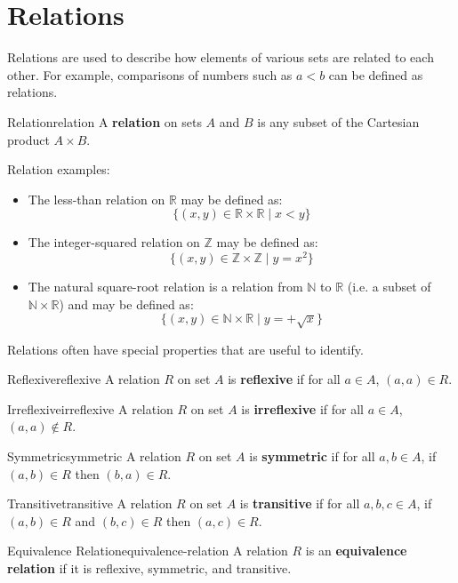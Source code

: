 \section{Relations}
Relations are used to describe how elements of various sets 
are related to each other. For example, comparisons of numbers such as 
\( a < b \) can be defined as relations.

\begin{definition}{Relation}{relation}
  A \textbf{relation} on sets \( A \) and \( B \) is any subset of the 
  Cartesian product \( A \times B \).  
\end{definition}

Relation examples:
\begin{itemize}
  \item The less-than relation on \( \mathbb{R} \) may be defined as:
    \[
      \{ (x, y) \in \mathbb{R} \times \mathbb{R} \mid x < y \}
    \]
  \item The integer-squared relation on \( \mathbb{Z} \) may be defined as:
    \[
      \{ (x, y) \in \mathbb{Z} \times \mathbb{Z} \mid y = x^2 \}
    \]
  \item The natural square-root relation is a relation from \( \mathbb{N} \) to \( \mathbb{R} \) 
  (i.e. a subset of \( \mathbb{N} \times \mathbb{R} \)) and may be defined as:
    \[
      \{ (x, y) \in \mathbb{N} \times \mathbb{R} \mid y = +\sqrt{x} \}
    \]
\end{itemize}

Relations often have special properties that are useful to identify.

\begin{definition}{Reflexive}{reflexive}
  A relation \( R \) on set \( A \) is \textbf{reflexive} if for all \( a \in A \), \( (a, a) \in R \).
\end{definition}
\begin{definition}{Irreflexive}{irreflexive}
  A relation \( R \) on set \( A \) is \textbf{irreflexive} if for all \( a \in A \), \( (a, a) \notin R \).
\end{definition}
\begin{definition}{Symmetric}{symmetric}
  A relation \( R \) on set \( A \) is \textbf{symmetric} if for all \( a, b \in A \), if \( (a, b) \in R \) then 
  \( (b, a) \in R \).
\end{definition}
\begin{definition}{Transitive}{transitive}
  A relation \( R \) on set \( A \) is \textbf{transitive} if for all \( a, b, c \in A \), if \( (a, b) \in R \) and 
  \( (b, c) \in R \) then \( (a, c) \in R \).
\end{definition}
\begin{definition}{Equivalence Relation}{equivalence-relation}
  A relation \( R \) is an \textbf{equivalence relation} if it is reflexive, symmetric, and transitive.
\end{definition}

